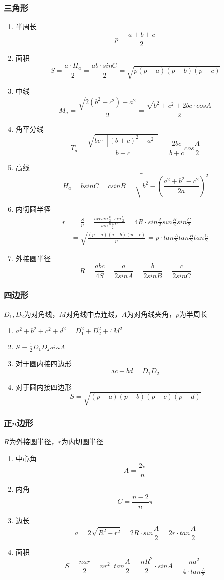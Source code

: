 \subsubsection{三角形}
	\begin{enumerate}
		\item 半周长
			$$p=\frac{a+b+c}{2}$$
		\item 面积
			$$S=\frac{a \cdot H_a}{2}=\frac{ab \cdot sinC}{2}=\sqrt{p(p-a)(p-b)(p-c)}$$
		\item 中线
			$$M_a=\frac{\sqrt{2(b^2+c^2)-a^2}}{2}=\frac{\sqrt{b^2+c^2+2bc \cdot cosA}}{2}$$
		\item 角平分线 
			$$T_a=\frac{\sqrt{bc \cdot [(b+c)^2-a^2]}}{b+c}=\frac{2bc}{b+c}cos\frac{A}{2}$$
		\item 高线
			$$H_a=bsinC=csinB=\sqrt{b^2-(\frac{a^2+b^2-c^2}{2a})^2}$$
		\item 内切圆半径
			\begin{align*}
				r&=\frac{S}{p}=\frac{arcsin\frac{B}{2} \cdot sin\frac{C}{2}}{sin\frac{B+C}{2}}=4R \cdot sin\frac{A}{2}sin\frac{B}{2}sin\frac{C}{2}\\
				&=\sqrt{\frac{(p-a)(p-b)(p-c)}{p}}=p \cdot tan\frac{A}{2}tan\frac{B}{2}tan\frac{C}{2}
			\end{align*}
		\item 外接圆半径
			$$R=\frac{abc}{4S}=\frac{a}{2sinA}=\frac{b}{2sinB}=\frac{c}{2sinC}$$
	\end{enumerate}
\subsubsection{四边形}
	$D_1, D_2$为对角线，$M$对角线中点连线，$A$为对角线夹角，$p$为半周长
	\begin{enumerate}
		\item $a^2+b^2+c^2+d^2=D_1^2+D_2^2+4M^2$
		\item $S=\frac{1}{2}D_1D_2sinA$
		\item 对于圆内接四边形
			$$ac+bd=D_1D_2$$
		\item 对于圆内接四边形
			$$S=\sqrt{(p-a)(p-b)(p-c)(p-d)}$$
	\end{enumerate}
\subsubsection{正$n$边形}
	$R$为外接圆半径，$r$为内切圆半径
	\begin{enumerate}
		\item 中心角
			$$A=\frac{2\pi}{n}$$
		\item 内角
			$$C=\frac{n-2}{n}\pi$$
		\item 边长
			$$a=2\sqrt{R^2-r^2}=2R \cdot sin\frac{A}{2}=2r \cdot tan\frac{A}{2}$$
		\item 面积
			$$S=\frac{nar}{2}=nr^2 \cdot tan\frac{A}{2}=\frac{nR^2}{2} \cdot sinA=\frac{na^2}{4 \cdot tan\frac{A}{2}}$$
	\end{enumerate}
